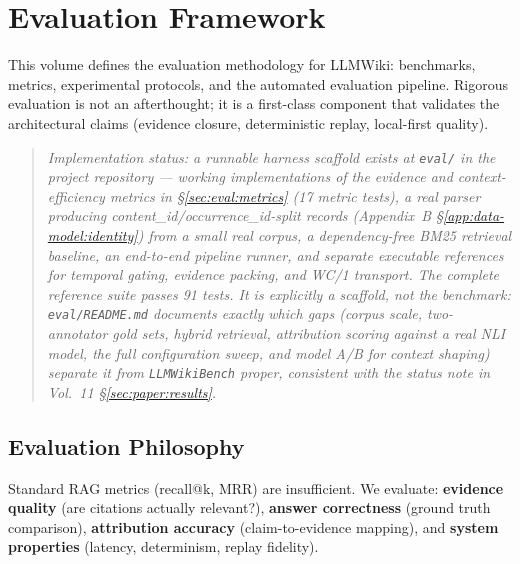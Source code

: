 \chapter{Evaluation Framework}
\label{cha:evaluation}

This volume defines the evaluation methodology for LLMWiki: benchmarks, metrics, experimental protocols, and the automated evaluation pipeline. Rigorous evaluation is not an afterthought; it is a first-class component that validates the architectural claims (evidence closure, deterministic replay, local-first quality).

\begin{quote}
\textit{Implementation status: a runnable harness scaffold exists at \texttt{eval/} in the project repository --- working implementations of the evidence and context-efficiency metrics in \S\ref{sec:eval:metrics} (17 metric tests), a real parser producing content\_id/occurrence\_id-split records (Appendix~B \S\ref{app:data-model:identity}) from a small real corpus, a dependency-free BM25 retrieval baseline, an end-to-end pipeline runner, and separate executable references for temporal gating, evidence packing, and WC/1 transport. The complete reference suite passes 91 tests. It is explicitly a scaffold, not the benchmark: \texttt{eval/README.md} documents exactly which gaps (corpus scale, two-annotator gold sets, hybrid retrieval, attribution scoring against a real NLI model, the full configuration sweep, and model A/B for context shaping) separate it from \texttt{LLMWikiBench} proper, consistent with the status note in Vol.~11 \S\ref{sec:paper:results}.}
\end{quote}

\section{Evaluation Philosophy}
\label{sec:eval:philosophy}

\begin{designprinciple}
Standard RAG metrics (recall@k, MRR) are insufficient. We evaluate: \textbf{evidence quality} (are citations actually relevant?), \textbf{answer correctness} (ground truth comparison), \textbf{attribution accuracy} (claim-to-evidence mapping), and \textbf{system properties} (latency, determinism, replay fidelity).
\end{designprinciple}


